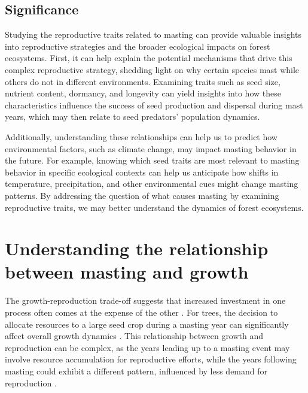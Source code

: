 \documentclass[11pt,letter]{article}
\begin{document}
\subsection{Significance} 
Studying the reproductive traits related to masting can provide valuable insights into reproductive strategies and the broader ecological impacts on forest ecosystems. First, it can help explain the potential mechanisms that drive this complex reproductive strategy, shedding light on why certain species mast while others do not in different environments. Examining traits such as seed size, nutrient content, dormancy, and longevity can yield insights into how these characteristics influence the success of seed production and dispersal during mast years, which may then relate to seed predators' population dynamics.\par

Additionally, understanding these relationships can help us to predict how environmental factors, such as climate change, may impact masting behavior in the future. For example, knowing which seed traits are most relevant to masting behavior in specific ecological contexts can help us anticipate how shifts in temperature, precipitation, and other environmental cues might change masting patterns. By addressing the question of what causes masting by examining reproductive traits, we may better understand the dynamics of forest ecosystems.\par

\section{Understanding the relationship between masting and growth}
The growth-reproduction trade-off suggests that increased investment in one process often comes at the expense of the other \citep{grime1977evidence, stearns1998evolution}. For trees, the decision to allocate resources to a large seed crop during a masting year can significantly affect overall growth dynamics \citep{hacket2016tree}. This relationship between growth and reproduction can be complex, as the years leading up to a masting event may involve resource accumulation for reproductive efforts, while the years following masting could exhibit a different pattern, influenced by less demand for reproduction \citep{kelly1994evolutionary}.\par
\end{document}
